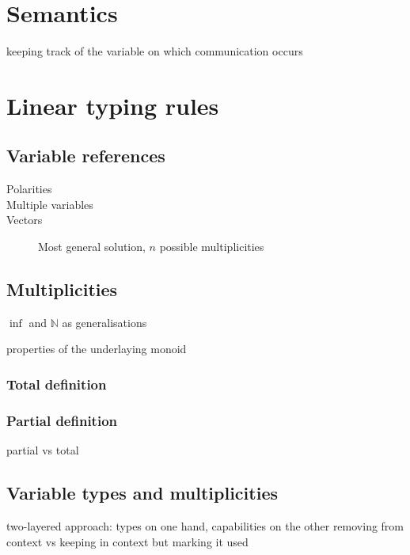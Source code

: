 \documentclass[a4paper,UKenglish,cleveref, autoref, thm-restate,authorcolumns]{lipics-v2019}
\begin{document}
\section{Semantics}

keeping track of the variable on which communication occurs

\section{Linear typing rules}

\subsection{Variable references}

\begin{description}
  \item[Polarities]
  \item[Multiple variables]
  \item[Vectors]
    Most general solution, $n$ possible multiplicities
\end{description}

\subsection{Multiplicities}

$\inf$ and $\mathbb{N}$ as generalisations

properties of the underlaying monoid

\subsubsection{Total definition}

\subsubsection{Partial definition}

partial vs total

\subsection{Variable types and multiplicities}

two-layered approach: types on one hand, capabilities on the other
removing from context vs keeping in context but marking it used
\end{document}
